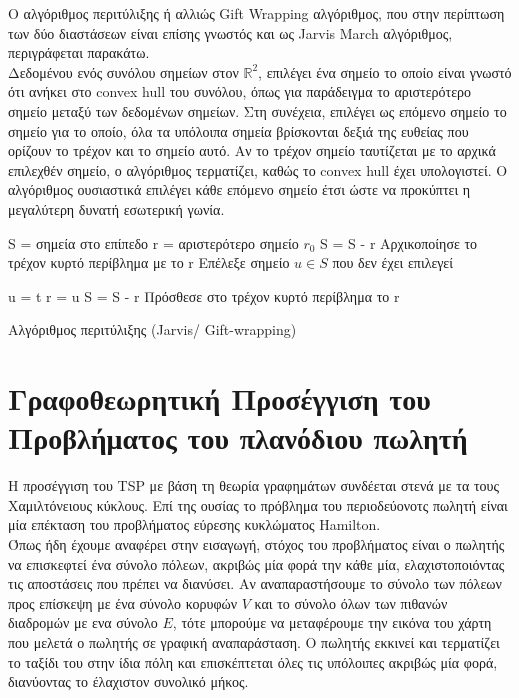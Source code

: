 \documentclass[oneside,12pt]{book}
\newcommand{\R}{\mathbb{R}}
\theoremstyle{definition}
\begin{document}
Ο αλγόριθμος περιτύλιξης ή αλλιώς Gift Wrapping αλγόριθμος, που στην περίπτωση των δύο διαστάσεων είναι
επίσης γνωστός και ως Jarvis March αλγόριθμος, περιγράφεται παρακάτω. \\

Δεδομένου ενός συνόλου σημείων στον \( \R^2 \),	επιλέγει ένα σημείο το οποίο είναι γνωστό ότι ανήκει στο convex hull του συνόλου, όπως για παράδειγμα το αριστερότερο σημείο μεταξύ των δεδομένων σημείων. Στη συνέχεια, επιλέγει ως επόμενο σημείο το σημείο για το οποίο, όλα τα υπόλοιπα σημεία βρίσκονται δεξιά της ευθείας που ορίζουν το τρέχον και το σημείο αυτό. Αν το τρέχον σημείο ταυτίζεται με το αρχικά επιλεχθέν σημείο, ο αλγόριθμος τερματίζει, καθώς το convex hull έχει υπολογιστεί. Ο αλγόριθμος ουσιαστικά επιλέγει κάθε επόμενο σημείο έτσι ώστε να προκύπτει η μεγαλύτερη δυνατή εσωτερική γωνία. \\

\begin{algorithm}[H]
	\SetAlgoLined
	
	S = σημεία στο επίπεδο \;
	r = αριστερότερο σημείο \(r_0\) \;
	S = S - r \;
	Αρχικοποίησε το τρέχον κυρτό περίβλημα με το r \;
	Επέλεξε σημείο \(u \in S\) που δεν έχει επιλεγεί \;
		
	{
		{
			{
				u = t		
			}
		}
		r = u \;
		S = S - {r} \;
		Πρόσθεσε στο τρέχον κυρτό περίβλημα το r \;
	}
	
	\caption{Αλγόριθμος περιτύλιξης (Jarvis/ Gift-wrapping)}
\end{algorithm}

\chapter{Γραφοθεωρητική Προσέγγιση του Προβλήματος του πλανόδιου πωλητή}
 
Η προσέγγιση του TSP με βάση τη θεωρία γραφημάτων συνδέεται στενά με τα τους Χαμιλτόνειους κύκλους. Επί της ουσίας το πρόβλημα του περιοδεύονοτς πωλητή είναι μία επέκταση του προβλήματος εύρεσης κυκλώματος Hamilton. \\ 

Όπως ήδη έχουμε αναφέρει στην εισαγωγή, στόχος του προβλήματος είναι ο πωλητής να επισκεφτεί ένα σύνολο πόλεων, ακριβώς μία φορά την κάθε μία, ελαχιστοποιόντας τις αποστάσεις που πρέπει να διανύσει. Αν αναπαραστήσουμε το σύνολο των πόλεων προς επίσκεψη με ένα σύνολο κορυφών \(V\) και το σύνολο όλων των πιθανών διαδρομών με ενα σύνολο \(E\), τότε μπορούμε να μεταφέρουμε την εικόνα του χάρτη που μελετά ο πωλητής σε γραφική αναπαράσταση. Ο πωλητής εκκινεί και τερματίζει το ταξίδι του στην ίδια πόλη και επισκέπτεται όλες τις υπόλοιπες ακριβώς μία φορά, διανύοντας το έλαχιστον συνολικό μήκος. \\
\end{document}
